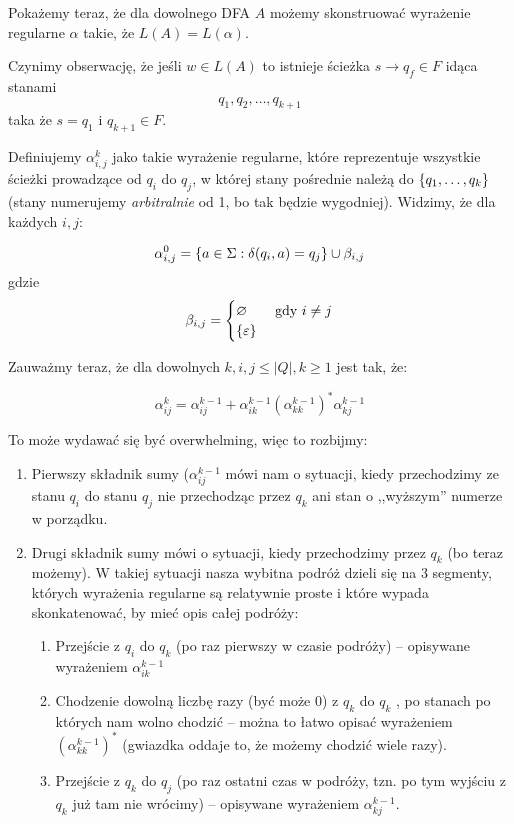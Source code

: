     Pokażemy teraz, że dla dowolnego DFA \(A\) możemy skonstruować wyrażenie regularne \(\alpha\) takie, że \( L(A) = L(\alpha)\). 
    
     Czynimy obserwację, że jeśli \( w \in L(A) \) to istnieje ścieżka \( s \rightarrow q_f \in F \) idąca stanami
    \[
        q_1, q_2, \dots, q_{k+1}
    \]
    taka że \( s = q_1 \) i \( q_{k+1} \in F\).
    
    Definiujemy \( \alpha_{i, j}^k \) jako takie wyrażenie regularne, które reprezentuje wszystkie ścieżki prowadzące od \( q_i \) do \( q_j \), w której stany pośrednie należą do \( \set{q_1, \dots, q_k} \) (stany numerujemy \textit{arbitralnie} od 1, bo tak będzie wygodniej). Widzimy, że dla każdych \(i, j\):
    
    \[
        \alpha_{i, j}^0 = \set{a \in \Sigma : \delta(q_i, a) = q_j } \cup \beta_{i, j}
    \]
    gdzie
    \[
        \beta_{i, j} = \begin{cases}
            \varnothing & \text{ gdy } i \neq j \\
            \set{\eps}
        \end{cases}
    \]
    
    Zauważmy teraz, że dla dowolnych \(k, i, j \leq |Q|, k \geq 1 \) jest tak, że:
    
    \[ 
        \alpha^{k}_{ij} = \alpha^{k-1}_{ij} + \alpha^{k-1}_{ik} (\alpha^{k-1}_{kk})^* \alpha^{k-1}_{kj} 
    \]
    
    To może wydawać się być overwhelming, więc to rozbijmy: 
    
    \begin{enumerate}
        \item Pierwszy składnik sumy (\( \alpha^{k-1}_{ij} \) mówi nam o sytuacji, kiedy przechodzimy ze stanu \(q_i\) do stanu \(q_j\) nie przechodząc przez \(q_k\)  ani stan o ,,wyższym'' numerze w porządku.
        \item Drugi składnik sumy mówi o sytuacji, kiedy przechodzimy przez \(q_k\) (bo teraz możemy). W takiej sytuacji nasza wybitna podróż dzieli się na 3 segmenty, których wyrażenia regularne są relatywnie proste i które wypada skonkatenować, by mieć opis całej podróży:
        
        \begin{enumerate}
            \item Przejście z \(q_i\) do \(q_k\) (po raz pierwszy w czasie podróży) -- opisywane wyrażeniem \(\alpha^{k-1}_{ik}\)
            \item Chodzenie dowolną liczbę razy (być może 0) z \(q_k\) do \(q_k\) , po stanach po których nam wolno chodzić -- można to łatwo opisać wyrażeniem \( (\alpha^{k-1}_{kk})^* \) (gwiazdka oddaje to, że możemy chodzić wiele razy).
            \item Przejście z \(q_k\) do \(q_j\) (po raz ostatni czas w podróży, tzn. po tym wyjściu z \(q_k\) już tam nie wrócimy) -- opisywane wyrażeniem \( \alpha^{k-1}_{kj}  \). 
        \end{enumerate}
    \end{enumerate}
    
